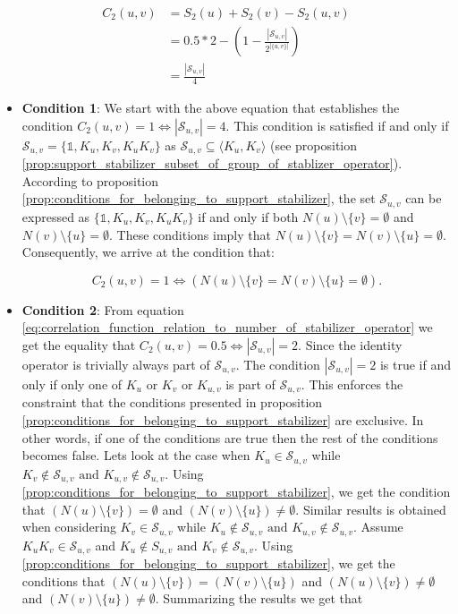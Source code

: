 \documentclass{article}
\newcommand{\identity}{\mathds{1}}
\begin{document}
\begin{align}
    C_2(u, v) &= S_2(u) + S_2(v) - S_2(u, v) \\
    &=0.5 * 2 - \left(1 - \frac{|\mathcal{S}_{u,v}|}{2^{|\{u,v\}|}}\right) \\
\label{eq:correlation_function_relation_to_number_of_stabilizer_operator}
    &= \frac{|\mathcal{S}_{u,v}|}{4} 
\end{align}
\begin{itemize}
    \item \textbf{Condition 1}: We start with the above equation that establishes the condition $ C_2(u, v) = 1 \iff |\mathcal{S}_{u,v}| = 4 $. This condition is satisfied if and only if $ \mathcal{S}_{u,v} = \{\identity, K_u, K_v, K_uK_v\} $ as $\mathcal{S}_{u,v} \subseteq \langle K_u, K_v \rangle$ (see proposition \ref{prop:support_stabilizer_subset_of_group_of_stablizer_operator}). According to proposition 
    \ref{prop:conditions_for_belonging_to_support_stabilizer}, the set $ \mathcal{S}_{u,v} $ can be expressed as $ \{\identity, K_u, K_v, K_uK_v\} $ if and only if both $ N(u) \setminus \{v\} = \emptyset $ and $ N(v) \setminus \{u\} = \emptyset $. These conditions imply that $ N(u) \setminus \{v\} = N(v) \setminus \{u\} = \emptyset $. Consequently, we arrive at the condition that:

    \begin{equation}
    C_2(u, v) = 1 \iff (N(u) \setminus \{v\} = N(v) \setminus \{u\} = \emptyset).
    \end{equation}
    
    \item \textbf{Condition 2}: From equation \ref{eq:correlation_function_relation_to_number_of_stabilizer_operator} we get the equality that  $ C_2(u, v) = 0.5 \iff |\mathcal{S}_{u,v}| = 2 $. Since the identity operator is trivially always part of $\mathcal{S}_{u,v}$. The condition $|\mathcal{S}_{u,v}| = 2 $ is true if and only if only one of $K_u$ or $K_v$ or $K_{u, v}$ is part of $\mathcal{S}_{u,v}$. This enforces the constraint that the conditions presented in proposition \ref{prop:conditions_for_belonging_to_support_stabilizer} are exclusive. In other words, if one of the conditions are true then the rest of the conditions becomes false. 
    Lets look at the case when $K_u \in \mathcal{S}_{u,v}$ while $K_v \not \in \mathcal{S}_{u, v} \text{ and } K_{u, v} \not \in \mathcal{S}_{u, v}$. Using \ref{prop:conditions_for_belonging_to_support_stabilizer}, we get the condition that $(N(u) \setminus \{v\}) = \emptyset $ and $(N(v) \setminus \{u\}) \neq \emptyset $. Similar results is obtained when considering $K_v \in \mathcal{S}_{u,v}$ while $K_u \not \in \mathcal{S}_{u, v} \text{ and } K_{u, v} \not \in \mathcal{S}_{u, v}$. 
    Assume $K_uK_v \in \mathcal{S}_{u,v}$ and $K_u \not \in S_{u, v} \text{ and } K_v \not \in \mathcal{S}_{u, v}$. Using \ref{prop:conditions_for_belonging_to_support_stabilizer}, we get the conditions that $ (N(u) \setminus \{v\}) = (N(v) \setminus \{u\}) $ and $(N(u) \setminus \{v\}) \neq \emptyset$ and $(N(v) \setminus \{u\}) \neq \emptyset$. Summarizing the results we get that 
    

\end{itemize}
\end{document}
